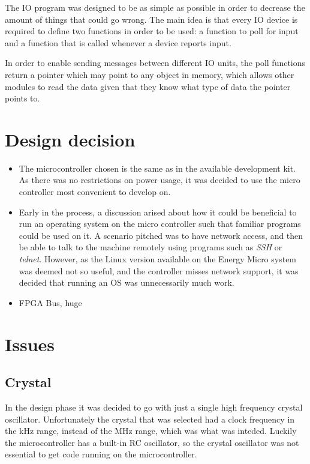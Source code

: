 The IO program was designed to be as simple as possible in order to decrease the amount of things that could go wrong.
The main idea is that every IO device is required to define two functions in order to be used: a function to poll for input and a function that is called whenever a device reports input.

In order to enable sending messages between different IO units, the poll functions return a pointer which may point to any object in memory, which allows other modules to read the data given that they know what type of data the pointer points to.

\section{Design decision}
\begin{itemize}
    \item The microcontroller chosen is the same as in the available development kit. As there was no restrictions on power usage,
          it was decided to use the micro controller most convenient to develop on.
    \item Early in the process, a discussion arised about how it could be beneficial to run an operating system on the micro controller
          such that familiar programs could be used on it. A scenario pitched was to have network access, and then be able to talk to the
          machine remotely using programs such as \textit{SSH} or \textit{telnet}. However, as the Linux version available on the Energy Micro
          system was deemed not so useful, and the controller misses network support, it was decided that running an OS was unnecessarily much work.
    \item FPGA Bus, huge
\end{itemize}

\section{Issues}
\subsection{Crystal}
In the design phase it was decided to go with just a single high frequency crystal oscillator.
Unfortunately the crystal that was selected had a clock frequency in the kHz range, instead of the MHz range, which was what was inteded.
Luckily the microcontroller has a built-in RC oscillator, so the crystal oscillator was not essential to get code running on the microcontroller.

